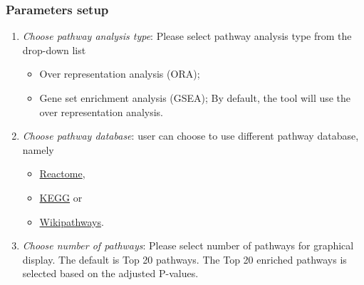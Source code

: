 \documentclass[
  a4paper,
  oneside,
  open=any]{scrreport}
\providecommand{\tightlist}{%
  \setlength{\itemsep}{0pt}\setlength{\parskip}{0pt}}\usepackage{longtable,booktabs,array}
\begin{document}
\hypertarget{parameters-setup-2}{%
\subsubsection{Parameters setup}\label{parameters-setup-2}}

\begin{enumerate}
\def\labelenumi{\arabic{enumi}.}
\tightlist
\item
  \emph{Choose pathway analysis type}: Please select pathway analysis
  type from the drop-down list

  \begin{itemize}
  \tightlist
  \item
    Over representation analysis (ORA);
  \item
    Gene set enrichment analysis (GSEA); By default, the tool will use
    the over representation analysis.
  \end{itemize}
\item
  \emph{Choose pathway database}: user can choose to use different
  pathway database, namely

  \begin{itemize}
  \tightlist
  \item
    \href{https://reactome.org/}{Reactome},
  \item
    \href{https://www.genome.jp/kegg/}{KEGG} or
  \item
    \href{https://www.wikipathways.org/}{Wikipathways}.
  \end{itemize}
\item
  \emph{Choose number of pathways}: Please select number of pathways for
  graphical display. The default is Top 20 pathways. The Top 20 enriched
  pathways is selected based on the adjusted P-values.
\end{enumerate}
\end{document}
